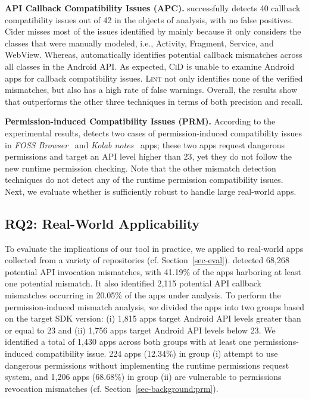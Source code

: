 \textbf{API Callback Compatibility Issues (APC).} \@approach
successfully detects 40 callback compatibility issues out of
42 in the objects of analysis, with no false positives.
{\sc Cider} misses most of the issues identified by
\@approach mainly because it only considers the classes that
were manually modeled, i.e., {\sf Activity}, {\sf Fragment},
{\sf Service}, and {\sf WebView}. Whereas, \@approach
automatically identifies potential callback mismatches
across all classes in the Android API.  As expected,
\textsc{CiD} is unable to examine Android apps for callback
compatibility issues. \textsc{Lint} not only identifies none
of the verified mismatches, but also has a high rate of
false warnings. Overall, the results show that \@approach
outperforms the other three techniques in terms of both
precision and recall.


\textbf{Permission-induced Compatibility Issues (PRM).}
According to the experimental results, %
\@approach detects two cases of permission-induced compatibility issues in
\textit{FOSS Browser}~\cite{fossbrowser} and
\textit{Kolab notes}~\cite{kolab} apps; these two apps
request dangerous permissions and target an API level
higher than 23, yet they do not follow the new runtime
permission checking. Note that the other mismatch
detection techniques do not detect any of the runtime
permission compatibility issues.  Next, we evaluate
whether \@approach is sufficiently robust to handle
large real-world apps.


\subsection{RQ2: Real-World Applicability}

To evaluate the implications of our tool in practice, we applied \@approach to real-world apps collected from a variety of repositories (cf. Section~\ref{sec-eval}).
\@approach detected 68,268 potential API invocation mismatches, with 41.19\% of the
apps harboring at least one potential mismatch. It also
identified 2,115 potential API callback mismatches occurring
in 20.05\% of the apps under analysis.  To perform the
permission-induced mismatch analysis, we divided the apps
into two groups based on the target SDK version: (i) 1,815
apps target Android API levels greater than or equal to 23
and (ii) 1,756 apps target Android API levels below 23. We
identified a total of 1,430 apps across both groups with at
least one permissions-induced compatibility issue. 224 apps
(12.34\%) in group (i) attempt to use dangerous permissions
without implementing the runtime permissions request system,
and 1,206 apps (68.68\%) in group (ii) are vulnerable to
permissions revocation mismatches (cf.
Section~\ref{sec-background:prm}).


